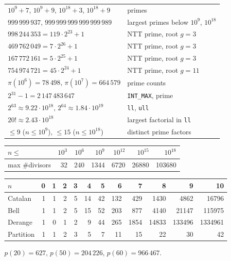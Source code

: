 {\scriptsize

\begin{tabular}{@{}ll@{}}
$10^9+7$, $10^9+9$, $10^{18}+3$, $10^{18}+9$ & primes \\
$999\,999\,937$, $999\,999\,999\,999\,999\,989$ & largest primes below $10^9$, $10^{18}$ \\
$998\,244\,353 = 119 \cdot 2^{23}+1$ & NTT prime, root $g = 3$ \\
$469\,762\,049 = 7 \cdot 2^{26}+1$ & NTT prime, root $g = 3$ \\
$167\,772\,161 = 5 \cdot 2^{25}+1$ & NTT prime, root $g = 3$ \\
$754\,974\,721 = 45 \cdot 2^{24}+1$ & NTT prime, root $g = 11$ \\
$\pi(10^6) = 78\,498$, $\pi(10^7) = 664\,579$ & prime counts \\
$2^{31} - 1 = 2\,147\,483\,647$ & \texttt{INT\_MAX}, prime \\
$2^{63} \approx 9.22 \cdot 10^{18}$, $2^{64} \approx 1.84 \cdot 10^{19}$ & \texttt{ll}, \texttt{ull} \\
$20! \approx 2.43 \cdot 10^{18}$ & largest factorial in \texttt{ll} \\
$\le 9$ ($n \le 10^9$), $\le 15$ ($n \le 10^{18}$) & distinct prime factors \\
\end{tabular}

\smallskip
\begin{tabular}{@{}l|rrrrrr@{}}
$n \le$ & $10^3$ & $10^6$ & $10^9$ & $10^{12}$ & $10^{15}$ & $10^{18}$ \\ \hline
max \#divisors & 32 & 240 & 1344 & 6720 & 26880 & 103680 \\
\end{tabular}

\smallskip
\begin{tabular}{@{}l|rrrrrrrrrrr@{}}
$n$ & 0 & 1 & 2 & 3 & 4 & 5 & 6 & 7 & 8 & 9 & 10 \\ \hline
Catalan & 1 & 1 & 2 & 5 & 14 & 42 & 132 & 429 & 1430 & 4862 & 16796 \\
Bell & 1 & 1 & 2 & 5 & 15 & 52 & 203 & 877 & 4140 & 21147 & 115975 \\
Derange & 1 & 0 & 1 & 2 & 9 & 44 & 265 & 1854 & 14833 & 133496 & 1334961 \\
Partition & 1 & 1 & 2 & 3 & 5 & 7 & 11 & 15 & 22 & 30 & 42 \\
\end{tabular}

$p(20) = 627$, $p(50) = 204\,226$, $p(60) = 966\,467$.

}
